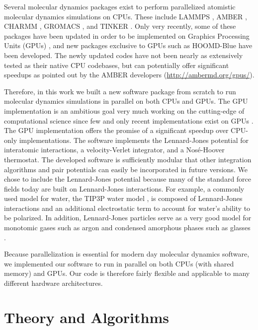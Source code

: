 \documentclass[12pt]{article}
\begin{document}
Several molecular dynamics packages exist to perform parallelized atomistic molecular dynamics simulations on CPUs.
%
These include LAMMPS \cite{Plimpton1995}, AMBER \cite{Case2010}, CHARMM \cite{MacKerell1998}, GROMACS \cite{Scott1999}, and TINKER \cite{Ponder2003}.
%
Only very recently, some of these packages have been updated in order to be implemented on Graphics Processing Units (GPUs) \cite{Brown2012,Brown2011,Gotz2012,Salomon-Ferrer2013}, and new packages exclusive to GPUs such as HOOMD-Blue\cite{Anderson2008} have been developed. %
The newly updated codes have not been nearly as extensively tested as their native CPU codebases, but can potentially offer significant speedups as pointed out by the AMBER developers (\url{http://ambermd.org/gpus/}).

Therefore, in this work we built a new software package from scratch to run molecular dynamics simulations in parallel on both CPUs and GPUs. The GPU implementation is an ambitious goal very much working on the cutting-edge of computational science since few and only recent implementations exist on GPUs \cite{Anderson2008,Brown2012,Brown2011,Gotz2012,Salomon-Ferrer2013}.
%
The GPU implementation offers the promise of a significant speedup over CPU-only implementations.
%
The software implements the Lennard-Jones potential for interatomic interactions, a velocity-Verlet integrator, and a Nos\'{e}-Hoover thermostat. The developed software is sufficiently modular that other integration algorithms and pair potentials can easily be incorporated in future versions.
%
We chose to include the Lennard-Jones potential because many of the standard force fields \cite{Case2010,MacKerell1998,Scott1999,Kaminski2001,Arnautova2006,Khoury2013} today are built on Lennard-Jones interactions.
%
For example, a commonly used model for water, the TIP3P water model \cite{Jorgensen1983}, is composed of Lennard-Jones interactions and an additional electrostatic term to account for water's ability to be polarized.
%
In addition, Lennard-Jones particles serve as a very good model for monotomic gases such as argon \cite{Rahman1964} and condensed amorphous phases such as glasses \cite{Debenedetti2001}.

Because parallelization is essential for modern day molecular dynamics software, we implemented our software to run in parallel on both CPUs (with shared memory) and GPUs.
%
Our code is therefore fairly flexible and applicable to many different hardware architectures.

\section{Theory and Algorithms}
\end{document}
